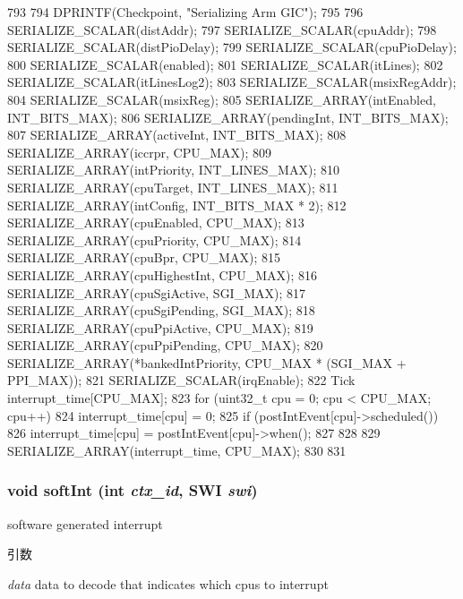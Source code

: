 \begin{DoxyCode}
793 {
794     DPRINTF(Checkpoint, "Serializing Arm GIC\n");
795 
796     SERIALIZE_SCALAR(distAddr);
797     SERIALIZE_SCALAR(cpuAddr);
798     SERIALIZE_SCALAR(distPioDelay);
799     SERIALIZE_SCALAR(cpuPioDelay);
800     SERIALIZE_SCALAR(enabled);
801     SERIALIZE_SCALAR(itLines);
802     SERIALIZE_SCALAR(itLinesLog2);
803     SERIALIZE_SCALAR(msixRegAddr);
804     SERIALIZE_SCALAR(msixReg);
805     SERIALIZE_ARRAY(intEnabled, INT_BITS_MAX);
806     SERIALIZE_ARRAY(pendingInt, INT_BITS_MAX);
807     SERIALIZE_ARRAY(activeInt, INT_BITS_MAX);
808     SERIALIZE_ARRAY(iccrpr, CPU_MAX);
809     SERIALIZE_ARRAY(intPriority, INT_LINES_MAX);
810     SERIALIZE_ARRAY(cpuTarget, INT_LINES_MAX);
811     SERIALIZE_ARRAY(intConfig, INT_BITS_MAX * 2);
812     SERIALIZE_ARRAY(cpuEnabled, CPU_MAX);
813     SERIALIZE_ARRAY(cpuPriority, CPU_MAX);
814     SERIALIZE_ARRAY(cpuBpr, CPU_MAX);
815     SERIALIZE_ARRAY(cpuHighestInt, CPU_MAX);
816     SERIALIZE_ARRAY(cpuSgiActive, SGI_MAX);
817     SERIALIZE_ARRAY(cpuSgiPending, SGI_MAX);
818     SERIALIZE_ARRAY(cpuPpiActive, CPU_MAX);
819     SERIALIZE_ARRAY(cpuPpiPending, CPU_MAX);
820     SERIALIZE_ARRAY(*bankedIntPriority, CPU_MAX * (SGI_MAX + PPI_MAX));
821     SERIALIZE_SCALAR(irqEnable);
822     Tick interrupt_time[CPU_MAX];
823     for (uint32_t cpu = 0; cpu < CPU_MAX; cpu++) {
824         interrupt_time[cpu] = 0;
825         if (postIntEvent[cpu]->scheduled()) {
826             interrupt_time[cpu] = postIntEvent[cpu]->when();
827         }
828     }
829     SERIALIZE_ARRAY(interrupt_time, CPU_MAX);
830 
831 }
\end{DoxyCode}
\hypertarget{classPl390_a682f28e23fc12360ec124caecc0247dd}{
\subsubsection[{softInt}]{\setlength{\rightskip}{0pt plus 5cm}void softInt (int {\em ctx\_\-id}, \/  SWI {\em swi})}}
\label{classPl390_a682f28e23fc12360ec124caecc0247dd}
software generated interrupt 
\begin{DoxyParams}{引数}
\item[{\em data}]data to decode that indicates which cpus to interrupt \end{DoxyParams}



